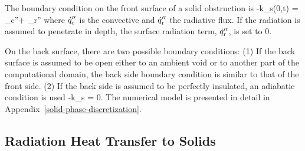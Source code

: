 The boundary condition on the front surface of a solid obstruction is
\be
 -k_{\rm s}(0,t) = _{\rm c}''+ _{\rm r}''
\ee
where $\dot{q}_{\rm c}''$ is the convective and $\dot{q}_{\rm r}''$ the radiative flux. If the radiation is assumed to penetrate in depth, the surface radiation term, $\dot{q}_{\rm r}''$, is set to 0.

On the back surface, there are two possible boundary conditions: (1) If the back surface is assumed to be open either to an ambient void or to another part of the computational domain, the back side boundary condition is similar to that of the front side. (2) If the back side is assumed to be perfectly insulated, an adiabatic condition is used
\be
 -k_{\rm s} = 0.
\ee
The numerical model is presented in detail in Appendix~\ref{solid-phase-discretization}.

\subsection{Radiation Heat Transfer to Solids}
\label{inradsection}

